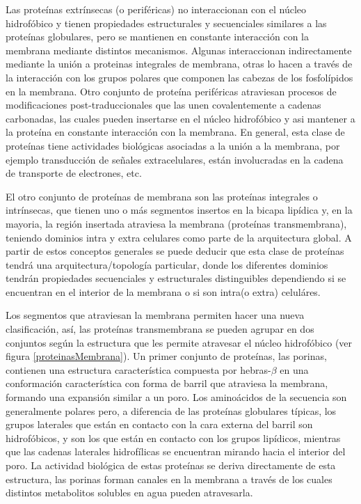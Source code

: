 Las proteínas extrínsecas (o periféricas) no interaccionan con el núcleo hidrofóbico y tienen propiedades estructurales y secuenciales similares a las proteínas globulares, 
pero se mantienen en constante interacción con la membrana mediante distintos mecanismos.
Algunas interaccionan indirectamente mediante la unión a proteinas integrales de membrana, otras lo hacen a través de la interacción con los grupos polares que componen las cabezas de los fosfolípidos en la membrana. 
Otro conjunto de proteína periféricas atraviesan procesos de modificaciones post-traduccionales que las unen covalentemente a cadenas carbonadas, las cuales pueden insertarse en el núcleo hidrofóbico y
asi mantener a la proteína en constante interacción con la membrana.
En general, esta clase de proteínas tiene actividades biológicas asociadas a la unión a la membrana, por ejemplo transducción de señales extracelulares, están involucradas en la cadena de transporte de electrones, etc.

El otro conjunto de proteínas de membrana son las proteínas integrales o intrínsecas, que tienen uno o más segmentos insertos en la bicapa lipídica y, en la mayoria, 
la región insertada atraviesa la membrana (proteínas transmembrana), teniendo dominios intra y extra celulares como parte de la arquitectura global.
A partir de estos conceptos generales se puede deducir que esta clase de proteínas tendrá una arquitectura/topología particular, 
donde los diferentes dominios tendrán propiedades secuenciales y estructurales distinguibles dependiendo si se encuentran en el interior de la membrana o si son intra(o extra) celuláres. 

Los segmentos que atraviesan la membrana permiten hacer una nueva clasificación, así, las proteínas transmembrana se pueden agrupar 
en dos conjuntos según la estructura que les permite atravesar el núcleo hidrofóbico (ver figura \ref{proteinasMembrana}).
Un primer conjunto de proteínas, las porinas, contienen una estructura característica compuesta por hebras-$\beta$ en una conformación característica con forma de barril que atraviesa la membrana, formando una expansión similar a un poro.
Los aminoácidos de la secuencia son generalmente polares pero, a diferencia de las proteínas globulares típicas, los grupos laterales que están en contacto con la cara externa del barril son hidrofóbicos, y son los que están en contacto con 
los grupos lipídicos, mientras que las cadenas laterales hidrofílicas se encuentran mirando hacia el interior del poro.
La actividad biológica de estas proteínas se deriva directamente de esta estructura, las porinas forman canales en la membrana a través de los cuales distintos metabolitos solubles en agua pueden atravesarla. 

